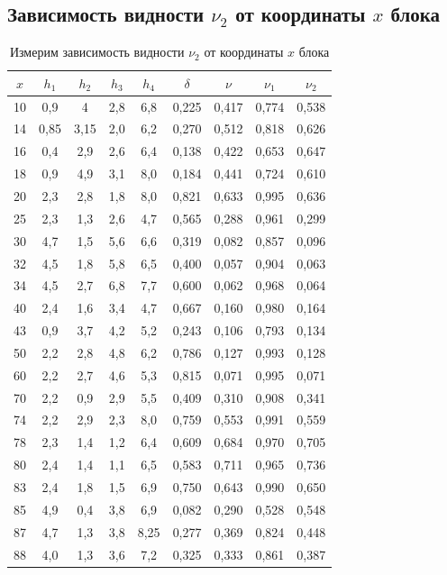 \documentclass{letask}
\begin{document}
\subsection*{Зависимость видности $\nu_2$ от координаты $x$ блока}
\begin{table}[H]
\centering
\caption{Измерим зависимость видности $\nu_2$ от координаты $x$ блока}
\begin{tabular}{|c|c|c|c|c|c|c|c|c|}
\hline
$x$ & $h_1$ & $h_2$ & $h_3$ & $h_4$ & $\delta$ & $\nu$ & $\nu_1$ & $\nu_2$ \\ \hline
10&	0,9&	4&		2,8&	6,8&	0,225&	0,417&	0,774&	0,538\\ \hline
14&	0,85&	3,15&	2,0&	6,2&	0,270&	0,512&	0,818&	0,626\\ \hline
16&	0,4&	2,9&	2,6&	6,4&	0,138&	0,422&	0,653&	0,647\\ \hline
18&	0,9&	4,9&	3,1&	8,0&	0,184&	0,441&	0,724&	0,610\\ \hline
20&	2,3&	2,8&	1,8&	8,0&	0,821&	0,633&	0,995&	0,636\\ \hline
25&	2,3&	1,3&	2,6&	4,7&	0,565&	0,288&	0,961&	0,299\\ \hline
30&	4,7&	1,5&	5,6&	6,6&	0,319&	0,082&	0,857&	0,096\\ \hline
32&	4,5&	1,8&	5,8&	6,5&	0,400&	0,057&	0,904&	0,063\\ \hline
34&	4,5&	2,7&	6,8&	7,7&	0,600&	0,062&	0,968&	0,064\\ \hline
40&	2,4&	1,6&	3,4&	4,7&	0,667&	0,160&	0,980&	0,164\\ \hline
43&	0,9&	3,7&	4,2&	5,2&	0,243&	0,106&	0,793&	0,134\\ \hline
50&	2,2&	2,8&	4,8&	6,2&	0,786&	0,127&	0,993&	0,128\\ \hline
60&	2,2&	2,7&	4,6&	5,3&	0,815&	0,071&	0,995&	0,071\\ \hline
70&	2,2&	0,9&	2,9&	5,5&	0,409&	0,310&	0,908&	0,341\\ \hline
74&	2,2&	2,9&	2,3&	8,0&	0,759&	0,553&	0,991&	0,559\\ \hline
78&	2,3&	1,4&	1,2&	6,4&	0,609&	0,684&	0,970&	0,705\\ \hline
80&	2,4&	1,4&	1,1&	6,5&	0,583&	0,711&	0,965&	0,736\\ \hline
83&	2,4&	1,8&	1,5&	6,9&	0,750&	0,643&	0,990&	0,650\\ \hline
85&	4,9&	0,4&	3,8&	6,9&	0,082&	0,290&	0,528&	0,548\\ \hline
87&	4,7&	1,3&	3,8&	8,25&	0,277&	0,369&	0,824&	0,448\\ \hline
88&	4,0&	1,3&	3,6&	7,2&	0,325&	0,333&	0,861&	0,387    \\ \hline
\end{tabular}
\end{table}
\end{document}
